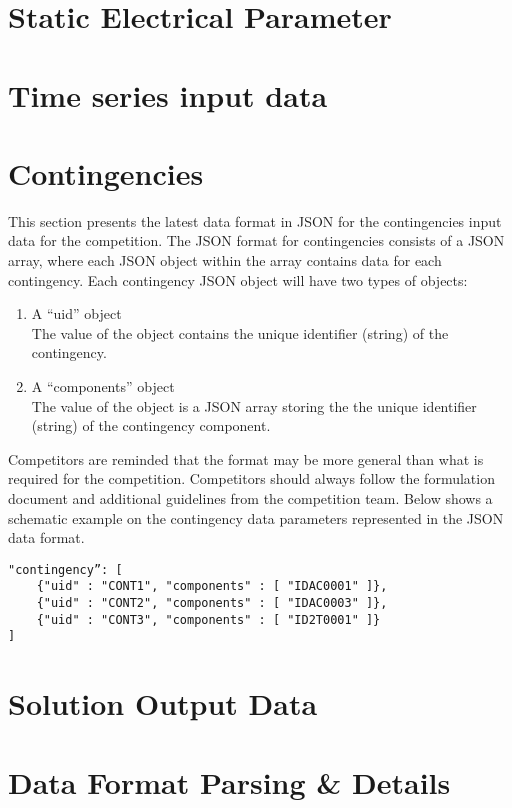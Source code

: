 \documentclass{article}
\begin{document}
\section{Static Electrical Parameter}
\label{sec:format_spec}



\section{Time series input data}


\section{Contingencies}
\label{sec:contingency}
This section presents the latest data format in JSON for the contingencies input data for the competition.
The JSON format for contingencies consists of a JSON array,
where each JSON object within the array contains data for each contingency.
Each contingency JSON object will have two types of objects:
\begin{enumerate}
    \item A ``uid'' object \\
    The value of the object contains the unique identifier (string) of the contingency. 
    \item A ``components'' object \\
    The value of the object is a JSON array storing the the unique identifier (string) of the contingency component.
\end{enumerate}
Competitors are reminded that the format may be more general than 
what is required for the competition. 
Competitors should always
follow the formulation document and additional guidelines from the competition team.
Below shows a schematic example on the contingency data parameters represented in the JSON data format. 
\begin{verbatim}
"contingency”: [
    {"uid" : "CONT1", "components" : [ "IDAC0001" ]},
    {"uid" : "CONT2", "components" : [ "IDAC0003" ]},
    {"uid" : "CONT3", "components" : [ "ID2T0001" ]}    
]    
\end{verbatim}



\section{Solution Output Data}


\section{Data Format Parsing \& Details}

\end{document}
